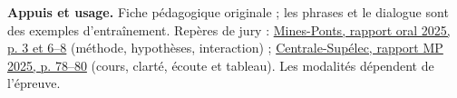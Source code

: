 \documentclass[11pt,a4paper]{article}
\begin{document}
\vfill
{\footnotesize\color{muted}
\textbf{Appuis et usage.} Fiche pédagogique originale ; les phrases et le dialogue sont des exemples d'entraînement.
Repères de jury :
\href{https://concoursminesponts.fr/wp-content/uploads/2025/10/Rapport-Oral-2025-VF.pdf#page=7}{Mines-Ponts, rapport oral 2025, p. 3 et 6--8}
(méthode, hypothèses, interaction) ;
\href{https://www.concours-centrale-supelec.fr/sites/default/files/documents/Rapports_Jury_2025_MP.pdf#page=78}{Centrale-Supélec, rapport MP 2025, p. 78--80}
(cours, clarté, écoute et tableau). Les modalités dépendent de l'épreuve.}
\end{document}
